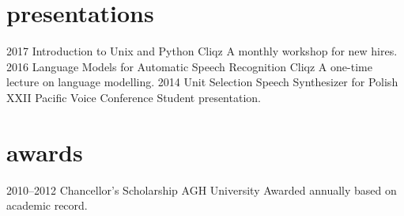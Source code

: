 \documentclass[]{friggeri-cv_osx}
\begin{document}
\section{presentations}
\begin{entrylist}
\entry
{2017}
{Introduction to Unix and Python}
{Cliqz}
{A monthly workshop for new hires.}
\entry
{2016}
{Language Models for Automatic Speech Recognition}
{Cliqz}
{A one-time lecture on language modelling.}
\entry
{2014}
{Unit Selection Speech Synthesizer for Polish}
{XXII Pacific Voice Conference}
{Student presentation.}
\end{entrylist}


\section{awards}
\begin{entrylist}
\entry
{2010--2012}
{Chancellor's Scholarship}
{AGH University}
{Awarded annually based on academic record.}
\end{entrylist}
\end{document}
